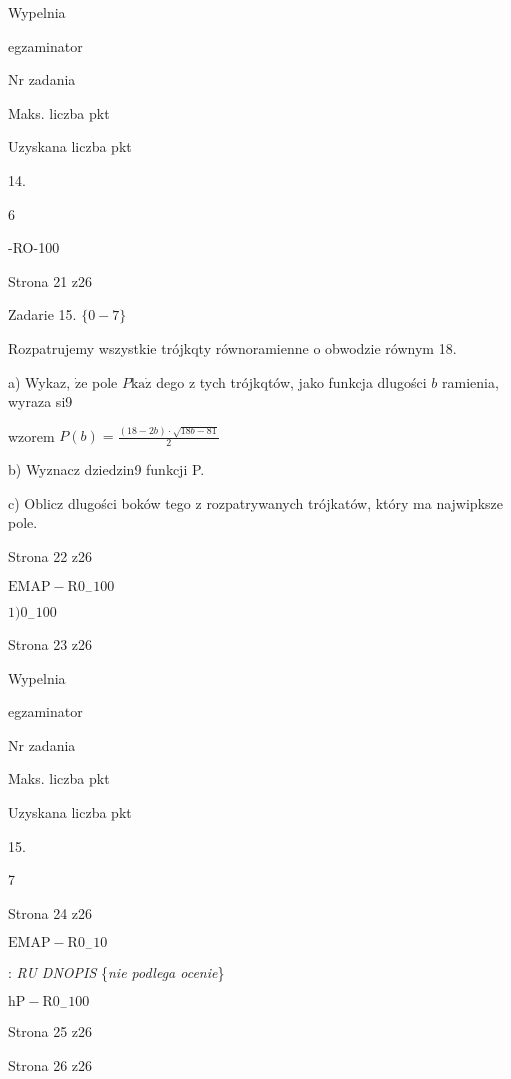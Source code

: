 \documentclass[a4paper,12pt]{article}
\begin{document}
Wypelnia

egzaminator

Nr zadania

Maks. liczba pkt

Uzyskana liczba pkt

14.

6

-RO-100

Strona 21 z26





Zadarie 15. $\{0-7\}$

Rozpatrujemy wszystkie trójkqty równoramienne o obwodzie równym 18.

a) Wykaz, $\dot{\mathrm{z}}\mathrm{e}$ pole $P \mathrm{k}\mathrm{a}\dot{\mathrm{z}}$ dego z tych trójkqtów, jako funkcja dlugości $b$ ramienia, wyraza si9

wzorem $P(b)=\displaystyle \frac{(18-2b)\cdot\sqrt{18b-81}}{2}$

b) Wyznacz dziedzin9 funkcji P.

c) Oblicz dlugości boków tego z rozpatrywanych trójkatów, który ma najwipksze pole.

Strona 22 z26

$\mathrm{E}\mathrm{M}\mathrm{A}\mathrm{P}-\mathrm{R}0_{-}100$





$1)0_{-}100$

Strona 23 z26





Wypelnia

egzaminator

Nr zadania

Maks. liczba pkt

Uzyskana liczba pkt

15.

7

Strona 24 z26

$\mathrm{E}\mathrm{M}\mathrm{A}\mathrm{P}-\mathrm{R}0_{-}10$





: {\it RU DNOPIS} \{{\it nie podlega ocenie}\}

$\mathrm{h}\mathrm{P}-\mathrm{R}0_{-}100$

Strona 25 z26





Strona 26 z26
\end{document}
